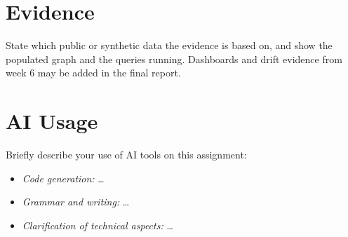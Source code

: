 \documentclass[report]{itvest}
\begin{document}
\section{Evidence}

State which public or synthetic data the evidence is based on, and show the
populated graph and the queries running. Dashboards
and drift evidence from week 6 may be added in the final report.

\section{AI Usage}

Briefly describe your use of AI tools on this assignment:

\begin{itemize}
  \item \emph{Code generation:} \ldots
  \item \emph{Grammar and writing:} \ldots
  \item \emph{Clarification of technical aspects:} \ldots
\end{itemize}



\end{document}
